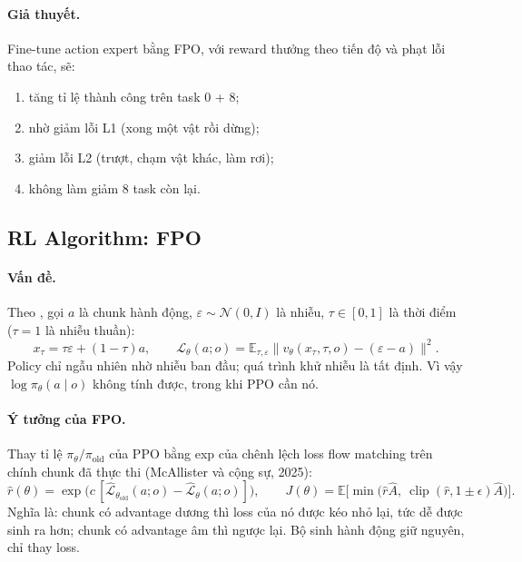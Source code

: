 \documentclass[10pt,a4paper]{article}
\newcommand{\code}[1]{\texttt{\detokenize{#1}}}
\newcommand{\Lhat}{\hat{\mathcal{L}}}
\newcommand{\thold}{\theta_{\text{old}}}
\begin{document}
\paragraph{Giả thuyết.} Fine-tune action expert bằng FPO, với reward thưởng theo tiến độ và phạt lỗi thao tác, sẽ:
\begin{enumerate}[label=\textbf{H\arabic*}]
\item tăng tỉ lệ thành công trên task 0 + 8;
\item nhờ giảm lỗi L1 (xong một vật rồi dừng);
\item giảm lỗi L2 (trượt, chạm vật khác, làm rơi);
\item không làm giảm 8 task còn lại.
\end{enumerate}

\subsection{RL Algorithm: FPO}\label{sec:algo}

\paragraph{Vấn đề.} Theo \code{modeling_smolvla.py}, gọi $a$ là chunk hành động, $\varepsilon\sim\mathcal N(0,I)$ là
nhiễu, $\tau\in[0,1]$ là thời điểm ($\tau=1$ là nhiễu thuần):
\begin{equation}
x_\tau=\tau\varepsilon+(1-\tau)a,\qquad
\mathcal L_\theta(a;o)=\mathbb E_{\tau,\varepsilon}\big\|v_\theta(x_\tau,\tau,o)-(\varepsilon-a)\big\|^2 .
\end{equation}
Policy chỉ ngẫu nhiên nhờ nhiễu ban đầu; quá trình khử nhiễu là tất định. Vì vậy $\log\pi_\theta(a\mid o)$ không tính được,
trong khi PPO cần nó.

\paragraph{Ý tưởng của FPO.} Thay tỉ lệ $\pi_\theta/\pi_{\text{old}}$ của PPO bằng exp của chênh lệch loss flow matching
trên chính chunk đã thực thi (McAllister và cộng sự, 2025):
\begin{equation}
\hat r(\theta)=\exp\!\big(c\,[\Lhat_{\thold}(a;o)-\Lhat_\theta(a;o)]\big),\qquad
J(\theta)=\mathbb E\big[\min\big(\hat r\hat A,\ \operatorname{clip}(\hat r,1\pm\epsilon)\hat A\big)\big].
\end{equation}
Nghĩa là: chunk có advantage dương thì loss của nó được kéo nhỏ lại, tức dễ được sinh ra hơn; chunk có advantage âm thì
ngược lại. Bộ sinh hành động giữ nguyên, chỉ thay loss.
\end{document}
